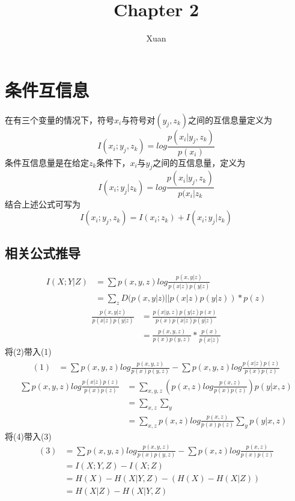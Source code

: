 \documentclass[a4paper, 12pt]{article}
\title{Chapter 2}
\author{Xuan}
\begin{document}
    \maketitle
    \section{条件互信息}
    在有三个变量的情况下，符号$x_i$与符号对$(y_j,z_k)$之间的互信息量定义为
    \[I(x_i;y_j,z_k)=log\frac{p(x_i|y_j,z_k)}{p(x_i)}\]
    条件互信息量是在给定$z_k$条件下，$x_i$与$y_j$之间的互信息量，定义为
    \[I(x_i;y_j|z_k)=log\frac{p(x_i|y_j,z_k)}{p(x_i|z_k}\]
    结合上述公式可写为
    \[I(x_i;y_j,z_k)=I(x_i;z_k)+I(x_i;y_j|z_k)\]
    \subsection{相关公式推导}
    \begin{equation}
    \begin{split}
        I(X;Y|Z)&=\sum p(x,y,z)log\frac{p(x,y|z)}{p(x|z)p(y|z)}\\
        &=\sum_zD(p(x,y|z)||p(x|z)p(y|z))*p(z)
    \end{split}
    \end{equation}
    \begin{equation}
    \begin{split}
        \frac{p(x,y|z)}{p(x|z)p(y|z)}&=\frac{p(x|y,z)p(y|z)p(x)}{p(x)p(x|z)p(y|z)}\\
        &=\frac{p(x,y,z)}{p(x)p(y,z)}*\frac{p(x)}{p(x|z)}
    \end{split}
    \end{equation}
    将(2)带入(1)
    \begin{equation}
        \begin{split}
            (1)&=\sum p(x,y,z)log\frac{p(x,y,z)}{p(x)p(y,z)}-\sum p(x,y,z)log \frac{p(x|z)p(z)}{p(x)p(z)}
        \end{split}
    \end{equation}
    \begin{equation}
        \begin{split}
            \sum p(x,y,z)log\frac{p(x|z)p(z)}{p(x)p(z)}&=\sum_{x,y,z}(p(x,z)log\frac{p(x,z)}{p(x)p(z)})p(y|x,z)\\
            &=\sum_{x,z}\sum_y\\
            &=\sum_{x,z}p(x,z)log\frac{p(x,z)}{p(x)p(z)}\sum_yp(y|x,z)
        \end{split}
    \end{equation}
    将(4)带入(3)
    \begin{equation}
        \begin{split}
            (3)&=\sum p(x,y,z)log\frac{p(x,y,z)}{p(x)p(y,z)}-\sum p(x,z)log\frac{p(x,z)}{p(x)p(z)}\\
            &=I(X;Y,Z)-I(X;Z)\\
            &=H(X)-H(X|Y,Z)-(H(X)-H(X|Z))\\
            &=H(X|Z)-H(X|Y,Z)
        \end{split}
    \end{equation}
\end{document}
